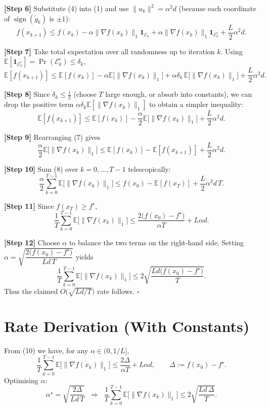 \documentclass{article}
\newcommand{\E}{\mathbb{E}}
\newcommand{\sign}{\operatorname{sign}}
\begin{document}
\noindent\textbf{[Step 6]} Substitute (4) into (1) and use $\|u_k\|^{2}= \alpha^{2}d$ (because each coordinate of $\sign(\tilde{g}_k)$ is $\pm1$):
\[
f(x_{k+1})\le f(x_k)-\alpha\|\nabla f(x_k)\|_{1}\mathbf{1}_{\mathcal{E}_k}
+ \alpha\|\nabla f(x_k)\|_{1}\mathbf{1}_{\mathcal{E}_k^{c}}
+\frac{L}{2}\alpha^{2}d.
\tag{5}
\]

\noindent\textbf{[Step 7]} Take total expectation over all randomness up to iteration $k$.
Using $\E[\mathbf{1}_{\mathcal{E}_k^{c}}]=\Pr(\mathcal{E}_k^{c})\le\delta_k$,
\[
\E[f(x_{k+1})]\le \E[f(x_k)]-\alpha\E\!\bigl[\|\nabla f(x_k)\|_{1}\bigr]
+ \alpha\delta_k\,\E\!\bigl[\|\nabla f(x_k)\|_{1}\bigr]
+\frac{L}{2}\alpha^{2}d.
\tag{6}
\]

\noindent\textbf{[Step 8]} Since $\delta_k\le \frac{1}{2}$ (choose $T$ large enough, or absorb into constants), we can drop the positive term $ \alpha\delta_k\E[\|\nabla f(x_k)\|_{1}] $ to obtain a simpler inequality:
\[
\E[f(x_{k+1})]\le \E[f(x_k)]-\frac{\alpha}{2}\E\!\bigl[\|\nabla f(x_k)\|_{1}\bigr]
+\frac{L}{2}\alpha^{2}d.
\tag{7}
\]

\noindent\textbf{[Step 9]} Rearranging (7) gives
\[
\frac{\alpha}{2}\E\!\bigl[\|\nabla f(x_k)\|_{1}\bigr]
\le \E[f(x_k)]-\E[f(x_{k+1})]+\frac{L}{2}\alpha^{2}d.
\tag{8}
\]

\noindent\textbf{[Step 10]} Sum (8) over $k=0,\dots,T-1$ telescopically:
\[
\frac{\alpha}{2}\sum_{k=0}^{T-1}\E\!\bigl[\|\nabla f(x_k)\|_{1}\bigr]
\le f(x_0)-\E[f(x_T)]+\frac{L}{2}\alpha^{2}d\,T.
\tag{9}
\]

\noindent\textbf{[Step 11]} Since $f(x_T)\ge f^{\star}$,
\[
\frac{1}{T}\sum_{k=0}^{T-1}\E\!\bigl[\|\nabla f(x_k)\|_{1}\bigr]
\le \frac{2\bigl(f(x_0)-f^{\star}\bigr)}{\alpha T}
+ L\alpha d.
\tag{10}
\]

\noindent\textbf{[Step 12]} Choose $\alpha$ to balance the two terms on the right‑hand side.
Setting $\alpha=\sqrt{\dfrac{2\bigl(f(x_0)-f^{\star}\bigr)}{L d\,T}}$ yields
\[
\frac{1}{T}\sum_{k=0}^{T-1}\E\!\bigl[\|\nabla f(x_k)\|_{1}\bigr]
\le 2\sqrt{\frac{L d\bigl(f(x_0)-f^{\star}\bigr)}{T}}.
\tag{11}
\]
Thus the claimed $O\!\bigl(\sqrt{Ld/T}\bigr)$ rate follows.  $\square$

\section*{Rate Derivation (With Constants)}
From (10) we have, for any $\alpha\in(0,1/L]$,
\[
\boxed{
\frac{1}{T}\sum_{k=0}^{T-1}\E\!\bigl[\|\nabla f(x_k)\|_{1}\bigr]
\le \frac{2\Delta}{\alpha T}+L\alpha d,
}
\qquad \Delta:=f(x_0)-f^{\star}.
\]
Optimising $\alpha$:
\[
\alpha^{\star}= \sqrt{\frac{2\Delta}{L d\,T}}\;\;\Longrightarrow\;\;
\frac{1}{T}\sum_{k=0}^{T-1}\E\!\bigl[\|\nabla f(x_k)\|_{1}\bigr]
\le 2\sqrt{\frac{L d\,\Delta}{T}}.
\]
\end{document}
